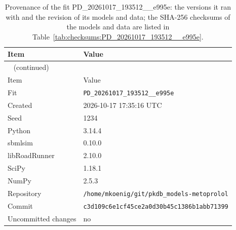 \documentclass{article}
\begin{document}
\begin{longtable}{ll}
\caption{Provenance of the fit PD\_20261017\_193512\_\_e995e: the versions it ran with and the revision of its models and data; the SHA-256 checksums of the models and data are listed in Table~\ref{tab:checksums:PD_20261017_193512__e995e}.}\label{tab:provenance:PD_20261017_193512__e995e} \\
\toprule
Item & Value \\
\midrule
\endfirsthead
\multicolumn{2}{l}{\small\tablename~\thetable{} (continued)} \\
\toprule
Item & Value \\
\midrule
\endhead
\bottomrule
\endlastfoot
Fit & \texttt{PD\_20261017\_193512\_\_e995e} \\
Created & 2026-10-17 17:35:16 UTC \\
Seed & 1234 \\
Python & 3.14.4 \\
sbmlsim & 0.10.0 \\
libRoadRunner & 2.10.0 \\
SciPy & 1.18.1 \\
NumPy & 2.5.3 \\
Repository & \texttt{/home/mkoenig/git/pkdb\_models-metoprolol} \\
Commit & \texttt{c3d109c6e1cf45ce2a0d30b45c1386b1abb71399} \\
Uncommitted changes & no \\
\end{longtable}



\end{document}
